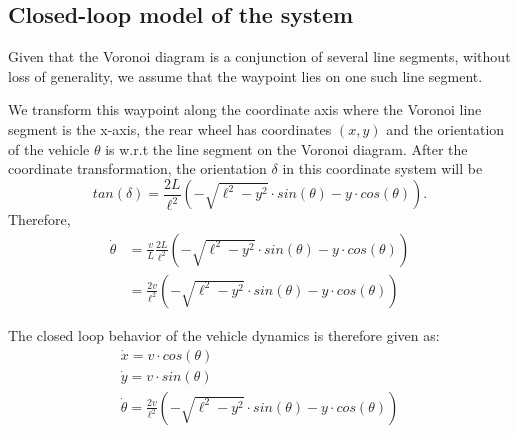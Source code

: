 \subsection{Closed-loop model of the system}
\label{sec:model}

Given that the Voronoi diagram is a conjunction of several line segments, without loss of generality, we assume that the waypoint lies on one such line segment.

We transform this waypoint along the coordinate axis where the Voronoi line segment is the x-axis, the rear wheel has coordinates $(x,y)$ and the orientation of the vehicle $\theta$ is w.r.t the line segment on the Voronoi diagram.
After the coordinate transformation, the orientation $\delta$ in this coordinate system will be
$$ tan(\delta) = \frac{2L}{\ell^2} (-\sqrt{\ell^2-y^2} \cdot sin(\theta)-y \cdot cos(\theta)). $$
Therefore,
\begin{align}
\dot{\theta} & = \frac{\displaystyle v}{\displaystyle L} \frac{\displaystyle 2L}{\displaystyle \ell^2} (-\sqrt{\ell^2-y^2} \cdot sin(\theta)-y \cdot cos(\theta)) \nonumber \\
& = \frac{\displaystyle 2v}{\displaystyle \ell^2} (-\sqrt{\ell^2-y^2} \cdot sin(\theta)-y \cdot cos(\theta))
\end{align}

The closed loop behavior of the vehicle dynamics is therefore given as:
\[
\begin{array}{l}
     \dot{x} = v \cdot cos(\theta) \\
     \dot{y} = v \cdot sin(\theta) \\
     \dot{\theta} = \frac{\displaystyle 2v}{\displaystyle \ell^2} (-\sqrt{\ell^2-y^2} \cdot sin(\theta)-y \cdot cos(\theta))
\end{array}
\]



